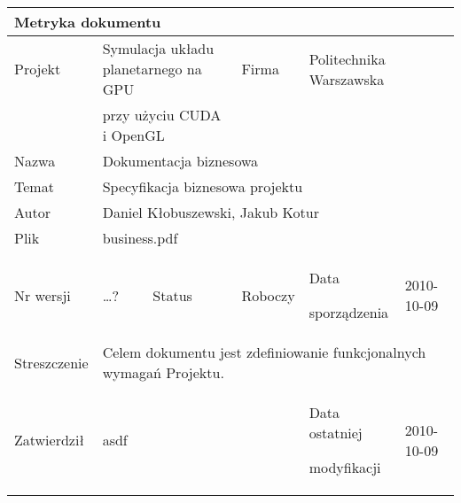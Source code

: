 \begin{tabular}{|p{2.5cm}|p{0.8cm}|p{2cm}|p{2cm}|p{3cm}|p{2cm}|}
	\hline
	\multicolumn{6}{|l|}{Metryka dokumentu} \\
	\hline
	Projekt & \multicolumn{2}{l|}{Symulacja układu planetarnego na GPU } &
	Firma & \multicolumn{2}{l|}{Politechnika Warszawska} \\
	&  \multicolumn{2}{l|}{przy użyciu CUDA i OpenGL} & &  \multicolumn{2}{l|}{} \\
	\hline
	Nazwa & \multicolumn{5}{l|}{Dokumentacja biznesowa} \\
	\hline
	Temat & \multicolumn{5}{l|}{Specyfikacja biznesowa projektu} \\
	\hline
	Autor & \multicolumn{5}{l|}{Daniel Kłobuszewski, Jakub Kotur} \\
	\hline
	Plik & \multicolumn{5}{l|}{business.pdf} \\
	\hline
	Nr wersji & \ldots? & Status & Roboczy & Data\par sporządzenia & 2010-10-09 \\
	\hline
	Streszczenie & \multicolumn{5}{p{11cm}|}{Celem dokumentu jest zdefiniowanie
		funkcjonalnych wymagań Projektu.} \\
	\hline
	Zatwierdził & \multicolumn{3}{l|}{asdf} &
	Data ostatniej\par modyfikacji & 2010-10-09 \\
	\hline
\end{tabular}

\newpage
